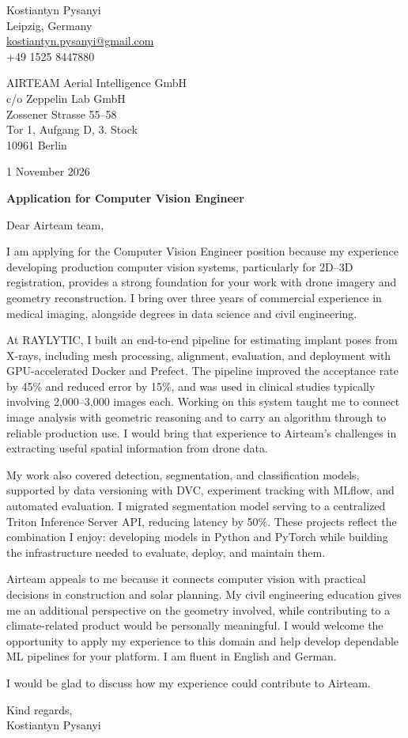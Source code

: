 \documentclass[11pt,a4paper]{article}
\begin{document}
\begin{flushright}
Kostiantyn Pysanyi\\
Leipzig, Germany\\
\href{mailto:kostiantyn.pysanyi@gmail.com}{kostiantyn.pysanyi@gmail.com}\\
+49 1525 8447880
\end{flushright}

AIRTEAM Aerial Intelligence GmbH\\
c/o Zeppelin Lab GmbH\\
Zossener Strasse 55--58\\
Tor 1, Aufgang D, 3. Stock\\
10961 Berlin

\begin{flushright}
1 November 2026
\end{flushright}

\textbf{Application for Computer Vision Engineer}

Dear Airteam team,

I am applying for the Computer Vision Engineer position because my experience developing production computer vision systems, particularly for 2D--3D registration, provides a strong foundation for your work with drone imagery and geometry reconstruction. I bring over three years of commercial experience in medical imaging, alongside degrees in data science and civil engineering.

At RAYLYTIC, I built an end-to-end pipeline for estimating implant poses from X-rays, including mesh processing, alignment, evaluation, and deployment with GPU-accelerated Docker and Prefect. The pipeline improved the acceptance rate by 45\% and reduced error by 15\%, and was used in clinical studies typically involving 2,000--3,000 images each. Working on this system taught me to connect image analysis with geometric reasoning and to carry an algorithm through to reliable production use. I would bring that experience to Airteam's challenges in extracting useful spatial information from drone data.

My work also covered detection, segmentation, and classification models, supported by data versioning with DVC, experiment tracking with MLflow, and automated evaluation. I migrated segmentation model serving to a centralized Triton Inference Server API, reducing latency by 50\%. These projects reflect the combination I enjoy: developing models in Python and PyTorch while building the infrastructure needed to evaluate, deploy, and maintain them.

Airteam appeals to me because it connects computer vision with practical decisions in construction and solar planning. My civil engineering education gives me an additional perspective on the geometry involved, while contributing to a climate-related product would be personally meaningful. I would welcome the opportunity to apply my experience to this domain and help develop dependable ML pipelines for your platform. I am fluent in English and German.

I would be glad to discuss how my experience could contribute to Airteam.

Kind regards,\\
Kostiantyn Pysanyi
\end{document}
